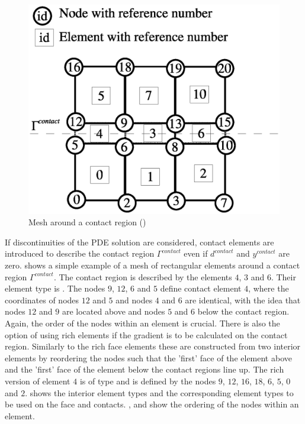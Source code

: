 \begin{figure}
\centerline{\includegraphics{FinleyContact}}
\caption{Mesh around a contact region ()}
\label{FINLEY FIG 01}
\end{figure}

If discontinuities of the PDE solution are considered, contact
elements are introduced to
describe the contact region $\Gamma^{contact}$ even if $d^{contact}$ and
$y^{contact}$ are zero.
 shows a simple example of a mesh of rectangular elements
around a contact region $\Gamma^{contact}$.
The contact region is described by the elements $4$, $3$ and $6$.
Their element type is .
The nodes $9$, $12$, $6$ and $5$ define contact element $4$, where the
coordinates of nodes $12$ and $5$ and nodes $4$ and $6$ are identical, with the
idea that nodes $12$ and $9$ are located above and nodes $5$ and $6$ below the
contact region.
Again, the order of the nodes within an element is crucial.
There is also the option of using rich elements if the gradient is to be
calculated on the contact region. Similarly to the rich face elements these
are constructed from two interior elements by reordering the nodes such that
the 'first' face of the element above and the 'first' face of the element below
the contact regions line up. The rich version of element $4$ is of type
 and is defined by the nodes $9$, $12$, $16$,
$18$, $6$, $5$, $0$ and $2$.
 shows the interior element types and the corresponding
element types to be used on the face and contacts.
,  and  show the ordering
of the nodes within an element.

